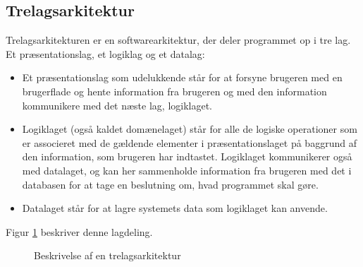 \subsection{Trelagsarkitektur}
Trelagsarkitekturen er en softwarearkitektur, der deler programmet op i tre lag. Et præsentationslag, et logiklag og et datalag: 
\begin{itemize}
    \item Et præsentationslag som udelukkende står for at forsyne brugeren med en brugerflade og hente information fra brugeren og med den information kommunikere med det næste lag, logiklaget.
    \item Logiklaget (også kaldet domænelaget) står for alle de logiske operationer som er associeret med de gældende elementer i præsentationslaget på baggrund af den information, som brugeren har indtastet. Logiklaget kommunikerer også med datalaget, og kan her sammenholde information fra brugeren med det i databasen for at tage en beslutning om, hvad programmet skal gøre.
    \item Datalaget står for at lagre systemets data som logiklaget kan anvende.
\end{itemize}

Figur \ref{fig:trelagsarkitekur} beskriver denne lagdeling. 

\begin{figure}[H]
    \centering
    \caption{Beskrivelse af en trelagsarkitektur}
    \label{fig:trelagsarkitekur}
\end{figure}

